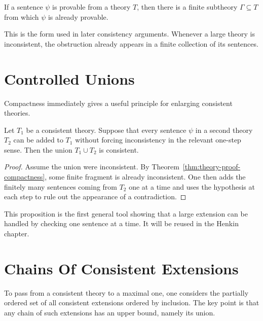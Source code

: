 \begin{theorem}
\label{thm:theory-proof-compactness}
If a sentence $\psi$ is provable from a theory $T$, then there is a finite
subtheory $\Gamma \subseteq T$ from which $\psi$ is already provable.
\end{theorem}

This is the form used in later consistency arguments. Whenever a large theory
is inconsistent, the obstruction already appears in a finite collection of its
sentences.

\section{Controlled Unions}

Compactness immediately gives a useful principle for enlarging consistent
theories.

\begin{proposition}
\label{prop:consistent-union}
Let $T_1$ be a consistent theory. Suppose that every sentence $\psi$ in a
second theory $T_2$ can be added to $T_1$ without forcing inconsistency in the
relevant one-step sense. Then the union $T_1 \cup T_2$ is consistent.
\end{proposition}

\begin{proof}
Assume the union were inconsistent. By
Theorem~\ref{thm:theory-proof-compactness}, some finite fragment is already
inconsistent. One then adds the finitely many sentences coming from $T_2$ one
at a time and uses the hypothesis at each step to rule out the appearance of a
contradiction.
\end{proof}

This proposition is the first general tool showing that a large extension can
be handled by checking one sentence at a time. It will be reused in the Henkin
chapter.

\section{Chains Of Consistent Extensions}

To pass from a consistent theory to a maximal one, one considers the partially
ordered set of all consistent extensions ordered by inclusion. The key point is
that any chain of such extensions has an upper bound, namely its union.

